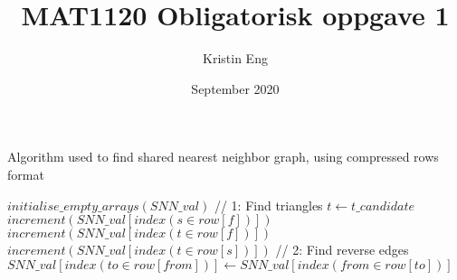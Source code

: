 \documentclass[a4paper, norsk] {article}
\title{MAT1120 Obligatorisk oppgave 1}
\author{Kristin Eng}
\date{September 2020}
\begin{document}
\maketitle


\begin{algorithm}
\label{ag:snn2}
\caption{Algorithm used to find shared nearest neighbor graph, using compressed rows format}
\begin{algorithmic}[0]
    \State $initialise\_empty\_arrays(SNN\_val)$
    // 1: Find triangles
                    \State $t \gets t\_candidate$
                    \State $increment(SNN\_val[index(s \in row[f])])$
                    \State $increment(SNN\_val[index(t \in row[f])])$
                    \State $increment(SNN\_val[index(t \in row[s])])$
                \EndIf
            \EndFor
        \EndFor
    \EndFor
    // 2: Find reverse edges
            \State $SNN\_val[index(to \in row[from])] \gets SNN\_val[index(from \in row[to])]$
        \EndFor
    \EndFor
\EndProcedure
\end{algorithmic}
\end{algorithm}
\end{document}
